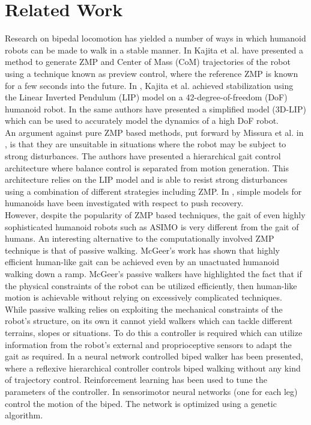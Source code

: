\documentclass[12pt,twoside]{article}
\theoremstyle{plain}
\theoremstyle{definition}
\theoremstyle{remark}
\newcommand{\forceindent}{\leavevmode{\parindent=2em\indent}}
\begin{document}
\section{Related Work}
\label{sec:Related_Work}
Research on bipedal locomotion has yielded a number of  ways in which humanoid robots can be made to walk in a stable manner. In \cite{kajita2003biped} Kajita et al. have presented a method to generate ZMP and Center of Mass (CoM) trajectories of the robot using a technique known as preview control, where the reference ZMP is known for a few seconds into the future. In \cite{kajita2010biped}, Kajita et al. achieved stabilization using the Linear Inverted Pendulum (LIP) model on a 42-degree-of-freedom (DoF) humanoid robot. In \cite{kajita20013d} the same authors have presented a simplified model (3D-LIP) which can be used to accurately model the dynamics of a high DoF robot.\\
\forceindent An argument against pure ZMP based methods, put forward by Missura et al. in \cite{missura2013omnidirectional, missura2014online, missura2015gradient}, is that they are unsuitable in situations where the robot may be subject to strong disturbances. The authors have presented a hierarchical gait control architecture where balance control is separated from motion generation. This architecture relies on the LIP model and is able to resist strong disturbances using a combination of different strategies including ZMP. In \cite{stephens2007humanoid}, simple models for humanoids have been investigated with respect to push recovery.\\
\forceindent However, despite the popularity of ZMP based techniques, the gait of even highly sophisticated humanoid robots such as ASIMO is very different from the gait of humans. An interesting alternative to the computationally involved ZMP technique is that of passive walking. McGeer's work \cite{mcgeer1990passive} has shown that highly efficient human-like gait can be achieved even by an unactuated humanoid walking down a ramp. McGeer's passive walkers have highlighted the fact that if the physical constraints of the robot can be utilized efficiently, then human-like motion is achievable without relying on excessively complicated techniques.\\
\forceindent While passive walking relies on exploiting the mechanical constraints of the robot's structure, on its own it cannot yield walkers which can tackle different terrains, slopes or situations. To do this a controller is required which can utilize information from the robot's external and proprioceptive sensors to adapt the gait as required. In \cite{geng2005fast} a neural network controlled biped walker has been presented, where a reflexive hierarchical controller controls biped walking without any kind of trajectory control. Reinforcement learning has been used to tune the parameters of the controller. In \cite{paul2005sensorimotor} sensorimotor neural networks (one for each leg) control the motion of the biped. The network is optimized using a genetic algorithm.\\
\end{document}
